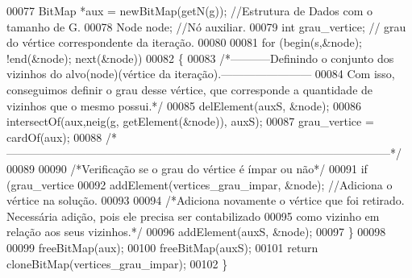 \begin{DoxyCode}
00077         BitMap *aux = newBitMap(getN(g)); \textcolor{comment}{//Estrutura de Dados com o tamanho de G.}
00078         Node node; \textcolor{comment}{//Nó auxiliar.}
00079         \textcolor{keywordtype}{int} grau\_vertice; \textcolor{comment}{// grau do vértice correspondente da iteração.}
00080 
00081         \textcolor{keywordflow}{for} (begin(s,&node); !end(&node); next(&node))
00082         \{
00083                 \textcolor{comment}{/*-----------Definindo o conjunto dos vizinhos do alvo(node)(vértice da
       iteração).------------------------}
00084 \textcolor{comment}{                Com isso, conseguimos definir o grau desse vértice, que corresponde a quantidade de
       vizinhos que o mesmo possui.*/}
00085                 delElement(auxS, &node);
00086                 intersectOf(aux,neig(g, getElement(&node)), auxS);
00087                 grau\_vertice = cardOf(aux);
00088                 \textcolor{comment}{/*
      ------------------------------------------------------------------------------------------------------*/}
00089                 
00090                 \textcolor{comment}{/*Verificação se o grau do vértice é ímpar ou não*/}
00091                 \textcolor{keywordflow}{if} (grau\_vertice %
00092                         addElement(vertices\_grau\_impar, &node); \textcolor{comment}{//Adiciona o vértice na solução.}
00093 
00094                 \textcolor{comment}{/*Adiciona novamente o vértice que foi retirado. Necessária adição, pois ele precisa ser
       contabilizado }
00095 \textcolor{comment}{                como vizinho em relação aos seus vizinhos.*/}
00096                 addElement(auxS, &node);
00097         \}
00098 
00099         freeBitMap(aux);
00100         freeBitMap(auxS);
00101         \textcolor{keywordflow}{return} cloneBitMap(vertices\_grau\_impar);        
00102 \}
\end{DoxyCode}
